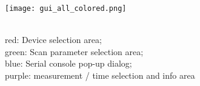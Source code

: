 \begin{figure}[h]
	\texttt{[image: gui\_all\_colored.png]}
	\caption{\\
		\color{Red}red\color{black}: Device selection area;\\
		\color{Green}green\color{black}: Scan parameter selection area;\\
		\color{Blue}blue\color{black}: Serial console pop-up dialog; \\
		\color{Purple}purple\color{black}: measurement / time selection and info area}
	\label{fig:guicolored}
\end{figure}
\par\bigskip
